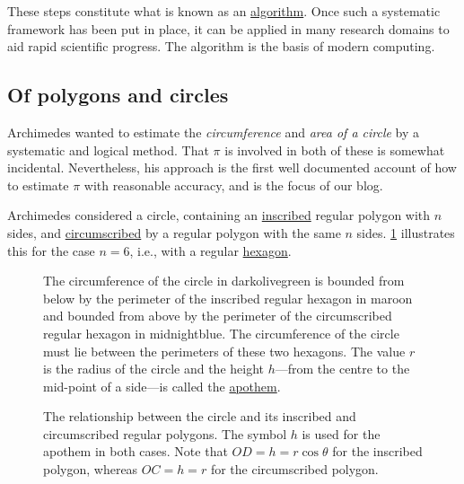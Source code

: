 \documentclass[
  a4paper,
]{article}
\begin{document}
These steps constitute what is known as an
\href{https://www.merriam-webster.com/dictionary/algorithm}{algorithm}.
Once such a systematic framework has been put in place, it can be
applied in many research domains to aid rapid scientific progress. The
algorithm is the basis of modern computing.

\subsection{Of polygons and circles}\label{of-polygons-and-circles}

Archimedes wanted to estimate the \emph{circumference} and \emph{area of
a circle} by a systematic and logical method. That \(\pi\) is involved
in both of these is somewhat incidental. Nevertheless, his approach is
the first well documented account of how to estimate \(\pi\) with
reasonable accuracy, and is the focus of our blog.

Archimedes considered a circle, containing an
\href{https://mathworld.wolfram.com/Inscribed.html}{inscribed} regular
polygon with \(n\) sides, and
\href{https://mathworld.wolfram.com/Circumscribed.html}{circumscribed}
by a regular polygon with the same \(n\) sides. \cref{fig:two-limits}
illustrates this for the case \(n = 6\), i.e., with a regular
\href{https://www.britannica.com/science/hexagon}{hexagon}.

\begin{figure}
\centering

\caption{The circumference of the circle in darkolivegreen is bounded
from below by the perimeter of the inscribed regular hexagon in maroon
and bounded from above by the perimeter of the circumscribed regular
hexagon in midnightblue. The circumference of the circle must lie
between the perimeters of these two hexagons. The value \(r\) is the
radius of the circle and the height \(h\)---from the centre to the
mid-point of a side---is called the
\href{https://en.wikipedia.org/wiki/Apothem}{apothem}.}\label{fig:two-limits}
\end{figure}

\begin{figure}
\centering

\caption[The relationship between the circle and its inscribed and
circumscribed regular polygons. The symbol \(h\) is used for the apothem
in both cases. Note that \(OD = h = r\cos\theta\) for the inscribed
polygon, whereas \(OC = h = r\) for the circumscribed polygon.]{The
relationship between the circle and its inscribed and circumscribed
regular polygons. The symbol \(h\) is used for the apothem in both
cases. Note that \(OD = h = r\cos\theta\) for the inscribed polygon,
whereas \(OC = h = r\) for the circumscribed
polygon.\footnotemark{}}\label{fig:sin-theta-tan-theta}
\end{figure}
\end{document}
